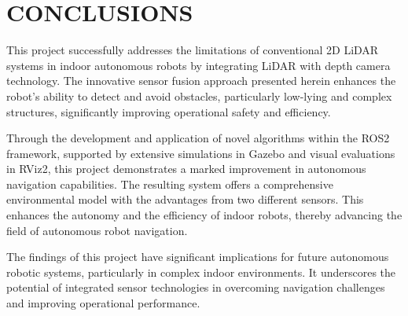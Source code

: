 \section{CONCLUSIONS}
\label{sec:conclusions}
This project successfully addresses the limitations of conventional 2D LiDAR systems in indoor autonomous robots 
by integrating LiDAR with depth camera technology. 
The innovative sensor fusion approach presented herein enhances the robot's ability to detect 
and avoid obstacles, particularly low-lying and complex structures, 
significantly improving operational safety and efficiency.

Through the development and application of novel algorithms within the ROS2 framework, 
supported by extensive simulations in Gazebo and visual evaluations in RViz2, 
this project demonstrates a marked improvement in autonomous navigation capabilities. 
The resulting system offers a comprehensive environmental model with the advantages from two different sensors. 
This enhances the autonomy and the efficiency of indoor robots, thereby advancing the field of autonomous robot navigation.

The findings of this project have significant implications for future autonomous robotic systems, 
particularly in complex indoor environments. 
It underscores the potential of integrated sensor technologies in overcoming navigation challenges and improving operational performance.